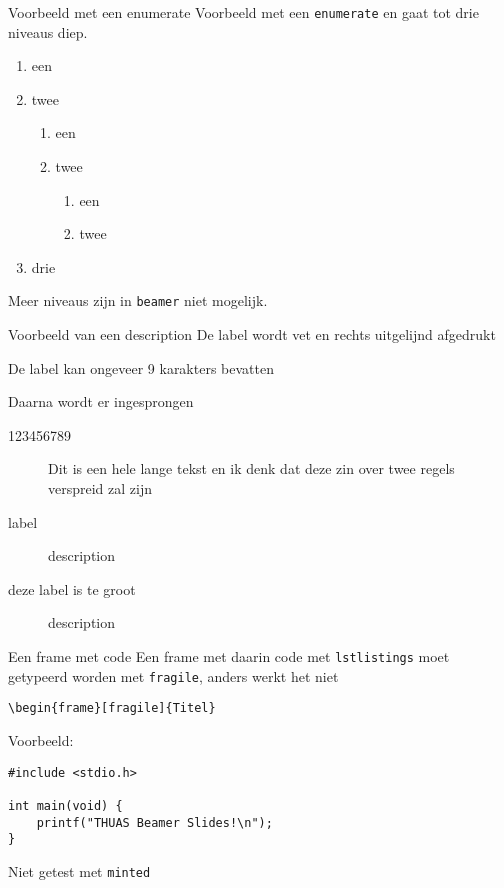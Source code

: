 \documentclass[fleqn,aspectratio=169,dutch,10pt]{beamer}
\begin{document}
\begin{frame}{Voorbeeld met een enumerate}
Voorbeeld met een \texttt{enumerate} en gaat tot drie niveaus diep.
\begin{enumerate}
\item een
\item twee
\begin{enumerate}
\item een
\item twee
\begin{enumerate}
\item een
\item twee
\end{enumerate}
\end{enumerate}
\item drie
\end{enumerate}
Meer niveaus zijn in \lstinline|beamer| niet mogelijk.
\end{frame}


\begin{frame}{Voorbeeld van een description}
De label wordt vet en rechts uitgelijnd afgedrukt

De label kan ongeveer 9 karakters bevatten

Daarna wordt er ingesprongen
\begin{description}
\item[123456789] Dit is een hele lange tekst en ik denk dat deze zin over twee regels verspreid zal zijn
\item[label] description
\item[deze label is te groot] description
\end{description}
\end{frame}


\begin{frame}[fragile]{Een frame met code}
Een frame met daarin code met \texttt{lstlistings} moet getypeerd worden met \texttt{fragile}, anders werkt het niet

\begin{lstlisting}
\begin{frame}[fragile]{Titel}
\end{lstlisting}

Voorbeeld:

\begin{lstlisting}
#include <stdio.h>

int main(void) {
    printf("THUAS Beamer Slides!\n");
}
\end{lstlisting}

Niet getest met \lstinline|minted|
\end{frame}
\end{document}

